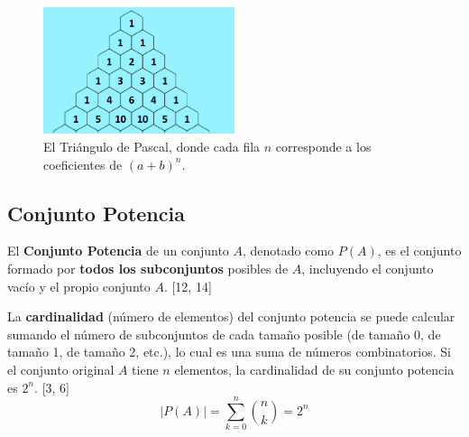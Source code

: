 \documentclass[12pt, letterpaper]{article}
\begin{document}
\begin{figure}[h!]
	\centering
	\includegraphics[width=0.5\textwidth]{pascal}
	\caption{El Triángulo de Pascal, donde cada fila $n$ corresponde a los coeficientes de $(a+b)^n$.}
	\label{fig:pascaltrig}
\end{figure}


\subsection{Conjunto Potencia}
El \textbf{Conjunto Potencia} de un conjunto $A$, denotado como $P(A)$, es el conjunto formado por \textbf{todos los subconjuntos} posibles de $A$, incluyendo el conjunto vacío y el propio conjunto $A$. [12, 14]

La \textbf{cardinalidad} (número de elementos) del conjunto potencia se puede calcular sumando el número de subconjuntos de cada tamaño posible (de tamaño 0, de tamaño 1, de tamaño 2, etc.), lo cual es una suma de números combinatorios. Si el conjunto original $A$ tiene $n$ elementos, la cardinalidad de su conjunto potencia es $2^n$. [3, 6]
\[ |P(A)| = \sum_{k=0}^{n} \binom{n}{k} = 2^n \]
\end{document}
